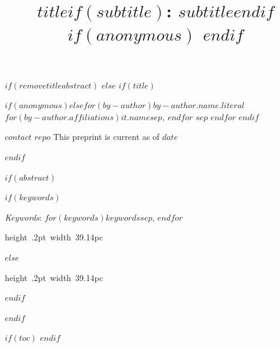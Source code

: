 \documentclass[$if(fontsize)$$fontsize$,$endif$$if(lang)$$babel-lang$,$endif$$if(papersize)$$papersize$,$endif$$for(classoption)$$classoption$$sep$,$endfor$]{article}
\title{\textbf{\huge $title$}$if(subtitle)$: $subtitle$$endif$ $if(anonymous)$ $endif$ }
\date{}
\newcommand*{\authorfont}{\fontfamily{phv}\selectfont}
\renewenvironment{abstract}
 {{%
    \setlength{\leftmargin}{0mm}
    \setlength{\rightmargin}{\leftmargin}%
  }%
  \relax}
 {\endlist}
\begin{document}
	

$if(removetitleabstract)$
$else$
$if(title)$

{%
\setlength{\parindent}{0pt}
\thispagestyle{plain}
{\fontsize{18}{20}\selectfont\raggedright 
\maketitle  %

}

{
   \vskip 4pt\relax \normalsize\fontsize{11}{12} 
$if(anonymous)$\hfill $else$$for(by-author)$\textbf{\authorfont $by-author.name.literal$} \hskip 5pt \emph{\small $for(by-author.affiliations)$$it.name$$sep$, $endfor$}  $sep$ \newline $endfor$ $endif$

}

{
\vskip 5pt\relax  
{\small $contact$}
\newline
{\small $repo$}
\newline
{\small This preprint is current as of $date$}
}
}

$endif$


$if(abstract)$
\begin{abstract}

\vskip 7pt %


$if(keywords)$

\vskip 5pt \noindent \small \emph{Keywords}: $for(keywords)$$keywords$$sep$, $endfor$ \par

    \hbox{\vrule height .2pt width 39.14pc}


$else$

    \hbox{\vrule height .2pt width 39.14pc}

$endif$

\end{abstract}

$endif$

\vskip -5.5pt

$if(toc)$
{
\hypersetup{linkcolor=black}
\setcounter{tocdepth}{$toc-depth$}
\tableofcontents
}
$endif$
\end{document}
